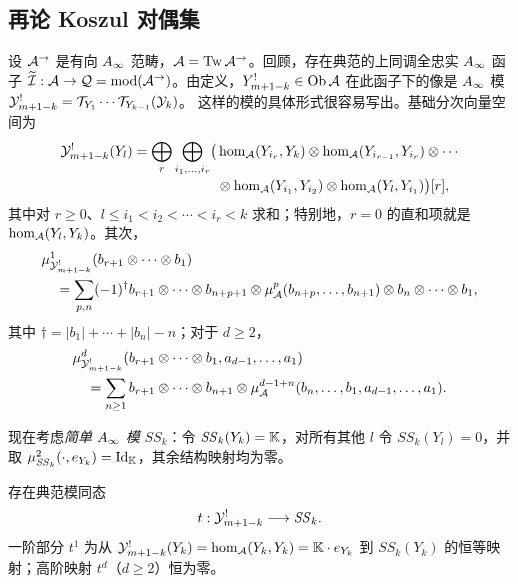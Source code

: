 \clearpage
\subsection{再论 Koszul 对偶集}\label{sec:5o}
设 $\mathcal A^{\to}$ 是有向 $A_\infty$ 范畴，$\mathcal A=\operatorname{Tw}\mathcal A^{\to}$。回顾，存在典范的上同调全忠实 $A_\infty$ 函子 $\widetilde{\mathcal I}:\mathcal A\to\mathcal Q=\operatorname{mod}(\mathcal A^{\to})$。由定义，$Y^!_{m+1-k}\in\operatorname{Ob}\mathcal A$ 在此函子下的像是 $A_\infty$ 模 $\mathcal Y^!_{m+1-k}=\mathcal T_{Y_1}\cdots\mathcal T_{Y_{k-1}}(\mathcal Y_k)$。
这样的模的具体形式很容易写出。基础分次向量空间为
\begin{equation}\label{eq:5.35}
\begin{aligned}
\mathcal Y^!_{m+1-k}(Y_l)=\bigoplus_r\bigoplus_{i_1,\ldots,i_r}
\bigl(&\hom_{\mathcal A}(Y_{i_r},Y_k)\otimes\hom_{\mathcal A}(Y_{i_{r-1}},Y_{i_r})\otimes\cdots\\[-2pt]
&\otimes\hom_{\mathcal A}(Y_{i_1},Y_{i_2})\otimes\hom_{\mathcal A}(Y_l,Y_{i_1})\bigr)[r],
\end{aligned}
\end{equation}
其中对 $r\geq0$、$l\leq i_1<i_2<\cdots<i_r<k$ 求和；特别地，$r=0$ 的直和项就是 $\hom_{\mathcal A}(Y_l,Y_k)$。其次，
\begin{equation}\label{eq:5.36}
\begin{aligned}
&\mu^1_{\mathcal Y^!_{m+1-k}}(b_{r+1}\otimes\cdots\otimes b_1)\\
&\quad=\sum_{p,n}(-1)^{\dagger}b_{r+1}\otimes\cdots\otimes b_{n+p+1}
\otimes\mu^p_{\mathcal A}(b_{n+p},\ldots,b_{n+1})\otimes b_n\otimes\cdots\otimes b_1,
\end{aligned}
\end{equation}
其中 $\dagger=|b_1|+\cdots+|b_n|-n$；对于 $d\geq2$，
\[
\begin{aligned}
&\mu^d_{\mathcal Y^!_{m+1-k}}(b_{r+1}\otimes\cdots\otimes b_1,a_{d-1},\ldots,a_1)\\
&\quad=\sum_{n\geq1}b_{r+1}\otimes\cdots\otimes b_{n+1}\otimes\mu^{d-1+n}_{\mathcal A}(b_n,\ldots,b_1,a_{d-1},\ldots,a_1).
\end{aligned}
\]
\begin{definition*}
现在考虑\emph{简单 $A_\infty$ 模} $\mathit{SS}_k$：令 $\mathit{SS}_k(Y_k)=\mathbb K$，对所有其他 $l$ 令 $\mathit{SS}_k(Y_l)=0$，并取 $\mu^2_{\mathit{SS}_k}(\cdot,e_{Y_k})=\operatorname{Id}_{\mathbb K}$，其余结构映射均为零。
\end{definition*}
存在典范模同态
\[
t:\mathcal Y^!_{m+1-k}\longrightarrow\mathit{SS}_k.
\]
一阶部分 $t^1$ 为从 $\mathcal Y^!_{m+1-k}(Y_k)=\hom_{\mathcal A}(Y_k,Y_k)=\mathbb K\cdot e_{Y_k}$ 到 $\mathit{SS}_k(Y_k)$ 的恒等映射；高阶映射 $t^d$（$d\geq2$）恒为零。
